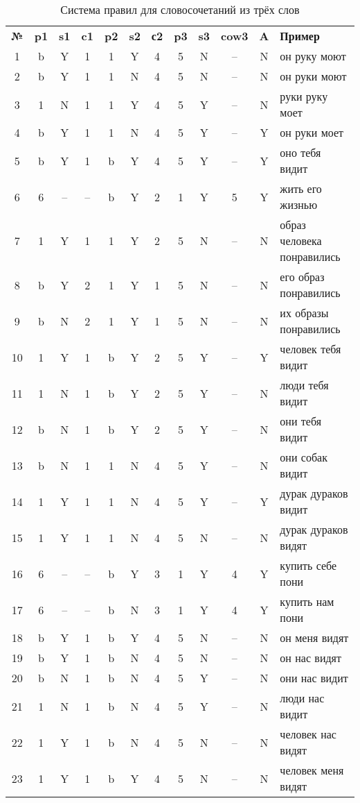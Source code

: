 \documentclass[main]{subfiles}
\begin{document}
\begin{longtable}[c]{|c|c|c|c|c|c|c|c|c|c|c|p{120px}|}
	\captionsetup{format=hang,labelsep = endash, singlelinecheck=false}
\caption{Система правил для словосочетаний из трёх слов}\label{tab2}\\
	\hline
	\textbf{№}&\textbf{p1} &\textbf{s1}&\textbf{c1}&\textbf{p2}&\textbf{s2}&\textbf{с2}&\textbf{p3}&\textbf{s3}&\textbf{cow3}&\textbf{A}&\textbf{Пример} \\ \hline
	1 &b  &Y  &1  &1  &Y  &4  &5  &N &--&N&он руку моют \\ \hline
	2&b&Y&1&1&N&4&5&N&--&N&он руки моют\\ \hline
	3&1&N&1&1&Y&4&5&Y&--&N&руки руку моет\\ \hline
	4&b&Y&1&1&N&4&5&Y&--&Y&он руки моет\\ \hline
	5&b&Y&1&b&Y&4&5&Y&--&Y& оно тебя видит\\ \hline
	6&6&--&--&b&Y&2&1&Y&5&Y&жить его жизнью \\ \hline
	7&1&Y&1&1&Y&2&5&N&--&N&образ человека понравились\\ \hline
	8&b&Y&2&1&Y&1&5&N&--&N&его образ понравились\\ \hline
	9&b&N&2&1&Y&1&5&N&--&N&их образы понравились\\ \hline
	10&1&Y&1&b&Y&2&5&Y&--&Y&человек тебя видит \\ \hline
	11&1&N&1&b&Y&2&5&Y&--&N&люди тебя видит\\ \hline
	12&b&N&1&b&Y&2&5&Y&--&N&они тебя видит\\ \hline
	13&b&N&1&1&N&4&5&Y&--&N&они собак видит\\ \hline
	14&1&Y&1&1&N&4&5&Y&--&Y&дурак дураков видит\\ \hline
	15&1&Y&1&1&N&4&5&N&--&N&дурак дураков видят\\ \hline
	16&6&--&--&b&Y&3&1&Y&4&Y&купить себе пони\\ \hline
	17&6&--&--&b&N&3&1&Y&4&Y&купить нам пони\\ \hline
	18&b&Y&1&b&Y&4&5&N&--&N&он меня видят\\ \hline
	19&b&Y&1&b&N&4&5&N&--&N&он нас видят\\ \hline
	20&b&N&1&b&N&4&5&Y&--&N&они нас видит\\ \hline
	21&1&N&1&b&N&4&5&Y&--&N&люди нас видит\\ \hline
	22&1&Y&1&b&N&4&5&N&--&N&человек нас видят\\ \hline
	23&1&Y&1&b&Y&4&5&N&--&N&человек меня видят\\ \hline
\end{longtable}
\end{document}
